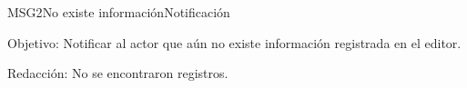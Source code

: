 \begin{mensaje}{MSG2}{No existe información}{Notificación}
	\item [Objetivo:] Notificar al actor que aún no existe información registrada en el editor.
	\item[Redacción:] No se encontraron registros.
\end{mensaje}